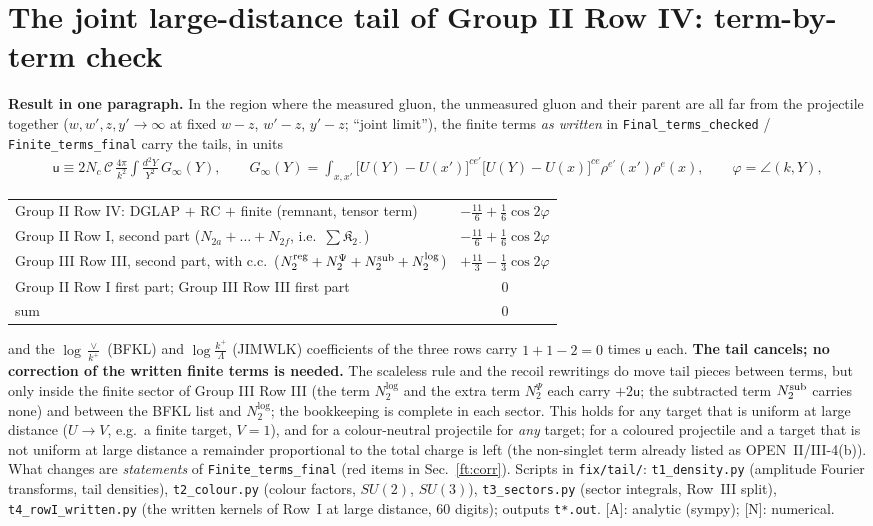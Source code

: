 \section{The joint large-distance tail of Group II Row IV: term-by-term check}\label{sec:tailfix}
\noindent\textbf{Result in one paragraph.} In the region where the measured gluon, the unmeasured gluon and their parent are all far from the projectile together ($w,w',z,y'\to\infty$ at fixed $w-z$, $w'-z$, $y'-z$; ``joint limit''), the finite terms \emph{as written} in \texttt{Final\_terms\_checked} / \texttt{Finite\_terms\_final} carry the tails, in units
\begin{align}
\mathsf{u}\equiv2N_{c}\,\mathcal{C}\,\frac{4\pi}{k^{2}}\int\frac{d^{2}Y}{Y^{2}}\,G_{\infty}(Y),\qquad G_{\infty}(Y)=\int_{x,x'}\big[U(Y)-U(x')\big]^{ce'}\big[U(Y)-U(x)\big]^{ce}\rho^{e'}(x')\rho^{e}(x),\qquad\varphi=\angle(k,Y),
\label{ft:unit}
\end{align}
\begin{center}
\renewcommand{\arraystretch}{1.3}
\begin{tabular}{|l|c|}\hline
Group II Row IV: DGLAP $+$ RC $+$ finite (remnant, tensor term) & $-\frac{11}{6}+\frac16\cos2\varphi$\\
Group II Row I, second part ($N_{2a}+\dots+N_{2f}$, i.e.\ $\sum\mathfrak{K}_{2\cdot}$) & $-\frac{11}{6}+\frac16\cos2\varphi$\\
Group III Row III, second part, with c.c.\ ($N_{2}^{\rm reg}+N_{2}^{\Psi}+N_{2}^{\rm sub}+N_{2}^{\log}$) & $+\frac{11}{3}-\frac13\cos2\varphi$\\
Group II Row I first part; Group III Row III first part & $0$\\\hline
sum & $0$\\\hline
\end{tabular}
\end{center}
and the $\log\frac{\vee}{k^{+}}$ (BFKL) and $\log\frac{k^{+}}{\Lambda}$ (JIMWLK) coefficients of the three rows carry $1+1-2=0$ times $\mathsf{u}$ each. \textbf{The tail cancels; no correction of the written finite terms is needed.} The scaleless rule and the recoil rewritings do move tail pieces between terms, but only inside the finite sector of Group III Row III (the term $N_{2}^{\log}$ and the extra term $N_{2}^{\Psi}$ each carry $+2\mathsf{u}$; the subtracted term $N_{2}^{\rm sub}$ carries none) and between the BFKL list and $N_{2}^{\log}$; the bookkeeping is complete in each sector. This holds for any target that is uniform at large distance ($U\to V$, e.g.\ a finite target, $V=1$), and for a colour-neutral projectile for \emph{any} target; for a coloured projectile and a target that is not uniform at large distance a remainder proportional to the total charge is left (the non-singlet term already listed as OPEN~II/III-4(b)). What changes are \emph{statements} of \texttt{Finite\_terms\_final} (red items in Sec.~\ref{ft:corr}). Scripts in \texttt{fix/tail/}: \texttt{t1\_density.py} (amplitude Fourier transforms, tail densities), \texttt{t2\_colour.py} (colour factors, $SU(2)$, $SU(3)$), \texttt{t3\_sectors.py} (sector integrals, Row~III split), \texttt{t4\_rowI\_written.py} (the written kernels of Row~I at large distance, 60 digits); outputs \texttt{t*.out}. [A]: analytic (sympy); [N]: numerical.

